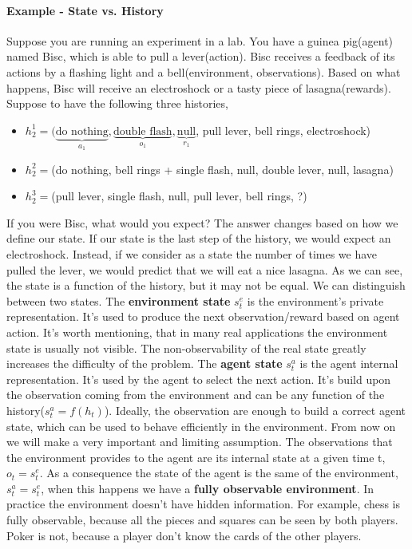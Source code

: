 \documentclass[main.tex]{subfiles}
\begin{document}
\paragraph{Example - State vs. History} Suppose you are running an experiment in a lab. You have a guinea pig(agent) named Bisc, which is able to pull a lever(action). Bisc receives a feedback of its actions by a flashing light and a bell(environment, observations). Based on what happens, Bisc will receive an electroshock or a tasty piece of lasagna(rewards). Suppose to have the following three histories,
\begin{itemize}
    \item $h_2^1 = (\underbrace{\text{do nothing}}_{a_1}, \underbrace{\text{double flash}}_{o_1}, \underbrace{\text{null}}_{r_1}$, pull lever, bell rings, electroshock)
    \item $h_2^2 = $(do nothing, bell rings + single flash, null, double lever, null, lasagna)
    \item $h_2^3 = $(pull lever, single flash, null, pull lever, bell rings, ?)
\end{itemize}
If you were Bisc, what would you expect? The answer changes based on how we define our state. If our state is the last step of the history, we would expect an electroshock. Instead, if we consider as a state the number of times we have pulled the lever, we would predict that we will eat a nice lasagna.
As we can see, the state is a function of the history, but it may not be equal.
\newline
\newline
We can distinguish between two states. The \textbf{environment state} $s_t^e$ is the environment's private representation. It's used to produce the next observation/reward based on agent action. It's worth mentioning, that in many real applications the environment state is usually not visible. The non-observability of the real state greatly increases the difficulty of the problem.
The \textbf{agent state} $s_t^a$ is the agent internal representation. It's used by the agent to select the next action. It's build upon the observation coming from the environment and can be any function of the history($s_t^a = f(h_t)$). Ideally, the observation are enough to build a correct agent state, which can be used to behave efficiently in the environment. From now on we will make a very important and limiting assumption. The observations that the environment provides to the agent are its internal state at a given time t, $o_t = s_t^e$. As a consequence the state of the agent is the same of the environment, $s_t^a = s_t^e$, when this happens we have a \textbf{fully observable environment}. In practice the environment doesn't have hidden information. For example, chess is fully observable, because all the pieces and squares can be seen by both players. Poker is not, because a player don't know the cards of the other players.
\end{document}
